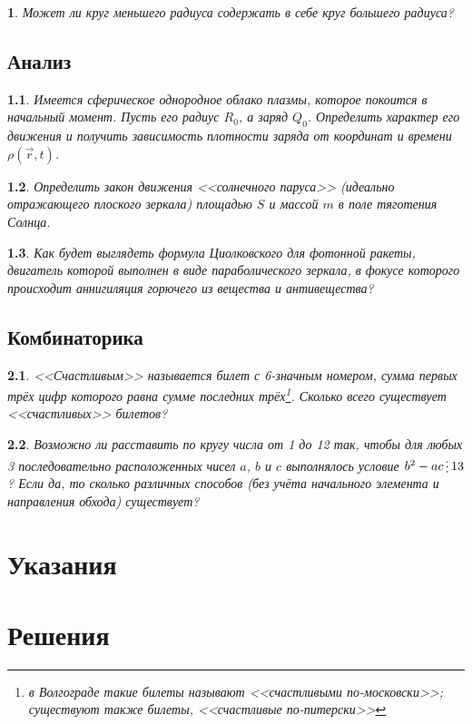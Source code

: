 \documentclass[a4paper]{book}
\theoremstyle{problemstyle}
\newtheorem{problem}{} %
\newcommand{\divisible}{\mathop{\raisebox{-2pt}{\vdots}}}
\begin{document}
    \begin{problem}
        Может ли круг меньшего радиуса содержать в себе круг большего радиуса?
    \end{problem}
    \chapter{Анализ}
    \begin{problem}
        Имеется сферическое однородное облако плазмы, которое покоится в
        начальный момент. Пусть его радиус \( R_0 \), а заряд \( Q_0 \).
        Определить характер его движения и получить зависимость плотности заряда
        от координат и времени \( \rho(\vec{r}, t) \).
    \end{problem}
    \begin{problem}
        Определить закон движения <<солнечного паруса>> (идеально
        отражающего плоского зеркала) площадью \( S \) и массой \(m\) в поле
        тяготения Солнца.
    \end{problem}
    \begin{problem}
        Как будет выглядеть формула Циолковского для фотонной ракеты, двигатель
        которой выполнен в виде параболического зеркала, в фокусе которого
        происходит аннигиляция горючего из вещества и антивещества?
    \end{problem}
    \chapter{Комбинаторика}
    \begin{problem}
        <<Счастливым>> называется билет с 6-значным номером, сумма первых трёх
        цифр которого равна сумме последних трёх\footnote{в Волгограде такие
        билеты называют <<счастливыми по-московски>>; существуют также билеты,
        <<счастливые по-питерски>>}. Сколько всего существует
        <<счастливых>> билетов?
    \end{problem}
    \begin{problem}
        Возможно ли расставить по кругу числа от 1 до 12 так, чтобы для любых 3
        последовательно расположенных чисел \(a\), \(b\) и \(c\) выполнялось
        условие \( b^2 - ac \divisible 13 \)? Если да, то сколько различных
        способов (без учёта начального элемента и направления обхода) существует?
    \end{problem}
    \part{Указания}
    \part{Решения}
\end{document}
